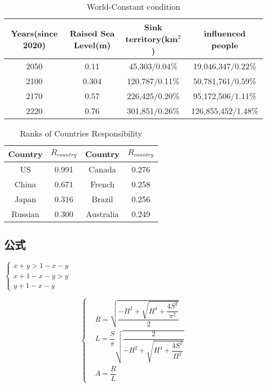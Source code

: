 \documentclass{mcmthesis}
\begin{document}
\begin{table}[htbp] 
  \setlength{\abovecaptionskip}{-0pt}   %
  \setlength{\belowcaptionskip}{10pt}
  \centering
	\caption{\label{tab:test}World-Constant condition}  %
		\begin{tabular}{cccc} 
 		\toprule %
     Years(since 2020) & Raised Sea Level(m) & Sink territory(km$^2$) & influenced people \\ 
  	\midrule %
 		2050 & 0.11 & 45,303/0.04\%  & 19,046,347/0.22\% \\ 
    2100 & 0.304 & 120,787/0.11\% & 50,781,761/0.59\% \\ 
    2170 & 0.57 & 226,425/0.20\% & 95,172,506/1.11\% \\
    2220 & 0.76 & 301,851/0.26\% & 126,855,452/1.48\% \\
  \bottomrule %
 \end{tabular} 
\end{table}

\begin{table}[htbp] 
  \setlength{\abovecaptionskip}{-0pt}   %
  \setlength{\belowcaptionskip}{10pt}
  \centering
	\caption{\label{tab:test}Ranks of Countries Responsibility}  %
		\begin{tabular}{cc|cc} 
 		\toprule %
     Country & $R_{country}$ & Country & $R_{country}$ \\ 
  	\midrule %
 		US & 0.991 & Canada & 0.276 \\ 
    China & 0.671 & French & 0.258 \\ 
    Japan & 0.316 & Brazil & 0.256 \\
    Russian & 0.300 & Australia & 0.249 \\
  \bottomrule %
 \end{tabular} 
\end{table}

\subsection{公式}

$\begin{cases}x+y>1-x-y\\x+1-x-y>y\\y+1-x-y\end{cases}$

\begin{equation}
  \left\{
  \begin{aligned}   %
  &R=\sqrt{\dfrac{-H^2+\sqrt{H^4+\dfrac{4S^2}{\pi^2}}}{2}} \\ 
  &L=\dfrac{S}{\pi}\sqrt{\dfrac{2}{-H^2+\sqrt{H^4+\dfrac{4S^2}{\Pi^2}}}}\\
  &A=\dfrac{R}{L}
  \end{aligned}
  \right.
\end{equation}
\end{document}
